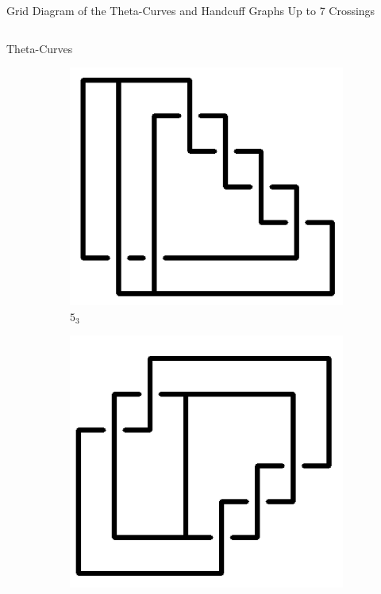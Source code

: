 \documentclass[final]{beamer}
\begin{document}
\begin{frame}[t]
\begin{alertblock}{Grid Diagram of the Theta-Curves and Handcuff Graphs Up to 7 Crossings}
\begin{columns}[t]
\begin{column}{0.5\textwidth}
\begin{alertblock}{Theta-Curves}
\begin{figure}
\begin{subfigure}{0.075\textwidth}
    \end{subfigure}
    \begin{subfigure}{0.075\textwidth}
    \includegraphics[width=\columnwidth]{../Midterm_Poster/grid_diagram/theta_5_3.png}
    \caption{$5_3$}
    \end{subfigure}
    \begin{subfigure}{0.075\textwidth}
    \includegraphics[width=\columnwidth]{../Midterm_Poster/grid_diagram/theta_5_4.png}

\end{subfigure}
\end{figure}
\end{alertblock}
\end{column}
\end{columns}
\end{alertblock}
\end{frame}
\end{document}
